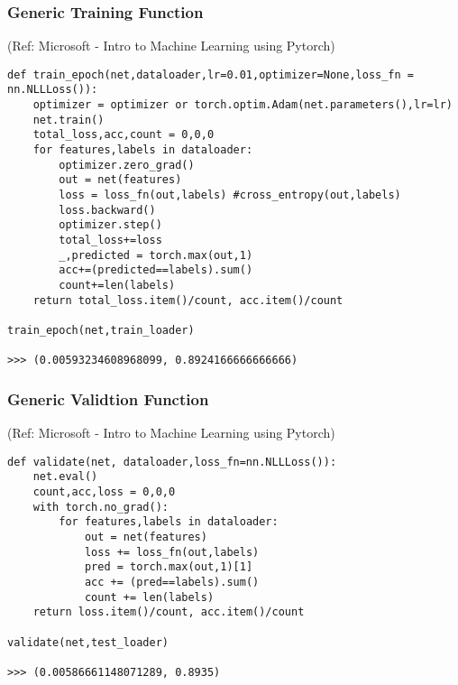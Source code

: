 \begin{frame}[fragile] \frametitle{Generic Training Function}


\tiny{(Ref: Microsoft - Intro to Machine Learning using Pytorch)}

\begin{lstlisting}
def train_epoch(net,dataloader,lr=0.01,optimizer=None,loss_fn = nn.NLLLoss()):
    optimizer = optimizer or torch.optim.Adam(net.parameters(),lr=lr)
    net.train()
    total_loss,acc,count = 0,0,0
    for features,labels in dataloader:
        optimizer.zero_grad()
        out = net(features)
        loss = loss_fn(out,labels) #cross_entropy(out,labels)
        loss.backward()
        optimizer.step()
        total_loss+=loss
        _,predicted = torch.max(out,1)
        acc+=(predicted==labels).sum()
        count+=len(labels)
    return total_loss.item()/count, acc.item()/count
		
train_epoch(net,train_loader)

>>> (0.00593234608968099, 0.8924166666666666)
\end{lstlisting}


\end{frame}

\begin{frame}[fragile] \frametitle{Generic Validtion Function}

\tiny{(Ref: Microsoft - Intro to Machine Learning using Pytorch)}

\begin{lstlisting}
def validate(net, dataloader,loss_fn=nn.NLLLoss()):
    net.eval()
    count,acc,loss = 0,0,0
    with torch.no_grad():
        for features,labels in dataloader:
            out = net(features)
            loss += loss_fn(out,labels) 
            pred = torch.max(out,1)[1]
            acc += (pred==labels).sum()
            count += len(labels)
    return loss.item()/count, acc.item()/count

validate(net,test_loader)

>>> (0.00586661148071289, 0.8935)
\end{lstlisting}


\end{frame}

